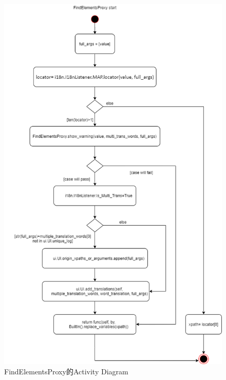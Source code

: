 \begin{figure}[H]
    \includegraphics[width= .87\textwidth]{../UML/i18n activity diagram-FindElementsProxy.png}
    \caption{FindElementsProxy的Activity Diagram}
\end{figure}

